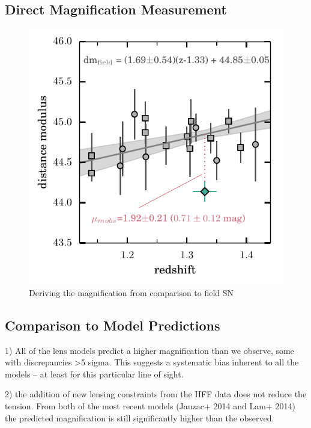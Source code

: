 \subsection{Direct Magnification Measurement}
\label{sec:DirectMagnificationMeasurement}


\begin{figure}
\begin{center}
\includegraphics[width=\columnwidth]{FIG/magnification_measurement}
\caption{ Deriving the magnification from comparison to field SN
\label{fig:magmeasure} }
\end{center}
\end{figure}

\subsection{Comparison to Model Predictions}
\label{sec:ComparisonToModelPredictions}


1) All of the lens models predict a higher magnification than we observe, some with discrepancies >5 sigma.  This suggests a systematic bias inherent to all the models -- at least for this particular line of sight. 

2) the addition of new lensing constraints from the HFF data does not reduce the tension.  From both of the most recent models (Jauzac+ 2014 and Lam+ 2014) the predicted magnification is still significantly higher than the observed. 

